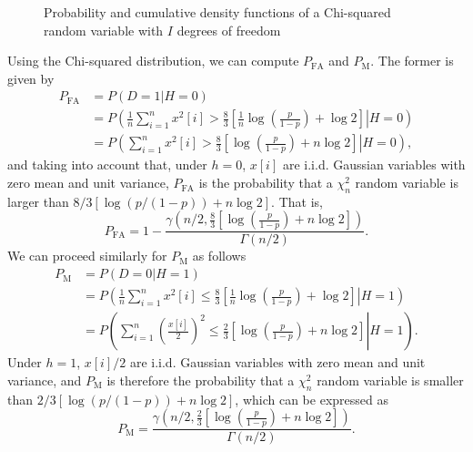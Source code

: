 \begin{figure}[t]
	\begin{center}
		 
	\end{center}
	\caption{Probability and cumulative density functions of a Chi-squared random variable with $I$ degrees of freedom}
	\label{fig:pdf_chi2}
\end{figure}

Using the Chi-squared distribution, we can compute $P_{\text{FA}}$ and $P_{\text{M}}$. The former is given by
\begin{align*}
	P_{\text{FA}} &= P(D = 1 | H = 0) \\ 
	&= P \left(\left. \frac{1}{n} \sum_{i = 1}^{n} x^2[i]  > \frac{8}{3} \left[ \frac{1}{n}  \log \left(\frac{p}{1 - p}  \right) + \log 2 \right] \right| H = 0 \right) \\ 
	&= P \left(\left. \sum_{i = 1}^{n} x^2[i]  > \frac{8}{3} \left[\log \left(\frac{p}{1 - p}  \right) + n \log 2 \right] \right| H = 0 \right),
\end{align*}
and taking into account that, under $h = 0$, $x[i]$ are i.i.d. Gaussian variables with zero mean and unit variance, $P_{\text{FA}}$ is the probability that a $\chi^2_n$ random variable is larger than $8/3 \left[\log \left(p/(1 - p)  \right) + n \log 2\right]$. That is,
\begin{equation*}
	P_{\text{FA}} = 1 - \frac{\gamma \left(n/2,\frac{8}{3} \left[\log \left(\frac{p}{1 - p}\right) + n \log 2 \right]\right)}{\Gamma(n/2)}.
\end{equation*}
We can proceed similarly for $P_{\text{M}}$ as follows
\begin{align*}
	P_{\text{M}} &= P(D = 0 | H = 1) \\ 
	&= P \left(\left. \frac{1}{n} \sum_{i = 1}^{n} x^2[i]  \leq \frac{8}{3} \left[ \frac{1}{n}  \log \left(\frac{p}{1 - p}  \right) + \log 2 \right] \right| H = 1 \right) \\ 
	&= P \left(\left. \sum_{i = 1}^{n} \left(\frac{x[i]}{2}\right)^2  \leq \frac{2}{3} \left[\log \left(\frac{p}{1 - p}  \right) + n \log 2 \right] \right| H = 1 \right).
\end{align*}
Under $h = 1$, $x[i]/2$ are i.i.d. Gaussian variables with zero mean and unit variance, and $P_{\text{M}}$ is therefore the probability that a $\chi^2_n$ random variable is smaller than $2/3 \left[\log \left(p/(1 - p)  \right) + n \log 2\right]$, which can be expressed as
\begin{equation*}
	P_{\text{M}} = \frac{\gamma \left(n/2,\frac{2}{3} \left[\log \left(\frac{p}{1 - p}  \right) + n \log 2 \right]\right)}{\Gamma(n/2)}.
\end{equation*}
